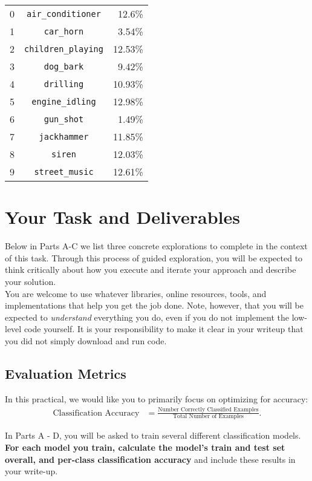 \documentclass[12pt]{article}
\begin{document}
\begin{center}
\begin{tabular}{r c r}
    0 &\verb|air_conditioner| & 12.6\% \\
    1 &\verb|car_horn| & 3.54\% \\
    2 &\verb|children_playing| & 12.53\%\\
    3 &\verb|dog_bark| & 9.42\%\\
    4 &\verb|drilling| & 10.93\%\\
    5 &\verb|engine_idling| & 12.98\%    \\
    6 &\verb|gun_shot| & 1.49\%\\
    7 &\verb|jackhammer| & 11.85\%\\
    8 &\verb|siren| & 12.03\%\\
    9 &\verb|street_music| & 12.61\%
\end{tabular}
\end{center}

\section{Your Task and Deliverables}\label{section:task}

Below in Parts A-C we list three concrete explorations to complete in the context of this task.  Through this process of guided exploration, you will be expected to think critically about how you execute and iterate your approach and describe your solution.\\

\noindent You are welcome to use whatever libraries, online resources, tools, and implementations that help you get the job done. Note, however, that you will be expected to \emph{understand} everything you do, even if you do not implement the low-level code yourself.  It is your responsibility to make it clear in your writeup that you did not simply download and run code.


\subsection{Evaluation Metrics}
In this practical, we would like you to primarily focus on optimizing for accuracy: 
\begin{align*}
    \text{Classification Accuracy} &= \frac{\text{Number Correctly Classified Examples}}{\text{Total Number of Examples}}.
\end{align*}

\noindent In Parts A - D, you will be asked to train several different classification models.  \textbf{For each model you train, calculate the model's train and test set overall, and per-class classification accuracy} and include these results in your write-up.\\
\end{document}
